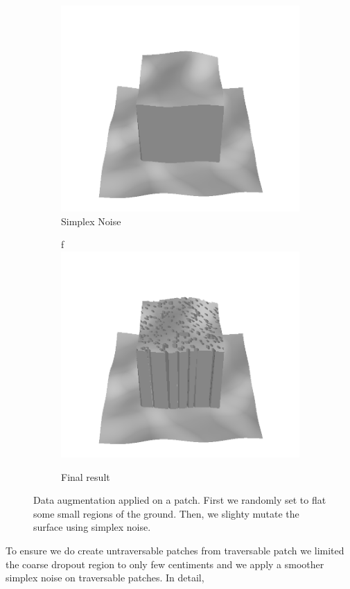 \documentclass[../document.tex]{subfiles}
\begin{document}
\begin{figure}[htbp]
          \begin{subfigure}[b]{0.32\textwidth}
            \includegraphics[width=\textwidth]{../img/data-aug/3d/center-simplex-mayavi.png}
            \caption{Simplex Noise}

        \end{subfigure}    
        \begin{subfigure}[b]{0.32\textwidth}f
            \includegraphics[width=\textwidth]{../img/data-aug/3d/center-final-mayavi.png}
            \caption{Final result}
        \end{subfigure}    
    \label{fig: data-aug}
    \caption{Data augmentation applied on a patch. First we randomly set to flat some small regions of the ground. Then, we slighty mutate the surface using simplex noise.}    
\end{figure}
To ensure we do create untraversable patches from traversable patch we limited the coarse dropout region to only few centiments and we apply a smoother simplex noise on traversable patches. In detail,
\end{document}
